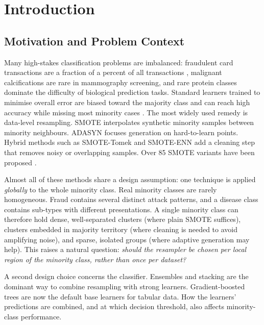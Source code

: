 \documentclass[11pt,a4paper]{article}
\begin{document}
\section{Introduction}

\subsection{Motivation and Problem Context}

Many high-stakes classification problems are imbalanced: fraudulent card transactions are a fraction of a percent of all transactions \cite{dalpozzolo2015calibrating}, malignant calcifications are rare in mammography screening, and rare protein classes dominate the difficulty of biological prediction tasks. Standard learners trained to minimise overall error are biased toward the majority class and can reach high accuracy while missing most minority cases \cite{he2009learning}. The most widely used remedy is data-level resampling. SMOTE \cite{chawla2002smote} interpolates synthetic minority samples between minority neighbours. ADASYN \cite{he2008adasyn} focuses generation on hard-to-learn points. Hybrid methods such as SMOTE-Tomek and SMOTE-ENN \cite{batista2004study} add a cleaning step that removes noisy or overlapping samples. Over 85 SMOTE variants have been proposed \cite{fernandez2018smote,kovacs2019empirical}.

Almost all of these methods share a design assumption: one technique is applied \emph{globally} to the whole minority class. Real minority classes are rarely homogeneous. Fraud contains several distinct attack patterns, and a disease class contains sub-types with different presentations. A single minority class can therefore hold dense, well-separated clusters (where plain SMOTE suffices), clusters embedded in majority territory (where cleaning is needed to avoid amplifying noise), and sparse, isolated groups (where adaptive generation may help). This raises a natural question: \emph{should the resampler be chosen per local region of the minority class, rather than once per dataset?}

A second design choice concerns the classifier. Ensembles and stacking \cite{wolpert1992stacked,galar2012review} are the dominant way to combine resampling with strong learners. Gradient-boosted trees \cite{chen2016xgboost,ke2017lightgbm} are now the default base learners for tabular data. How the learners' predictions are combined, and at which decision threshold, also affects minority-class performance.
\end{document}
